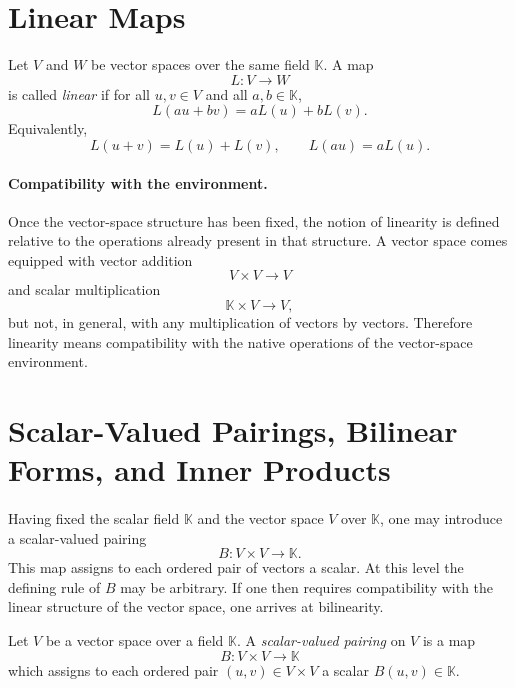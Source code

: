 \documentclass{article}
\begin{document}
\section{Linear Maps}

\begin{definition}
Let $V$ and $W$ be vector spaces over the same field $\mathbb{K}$. A map
$$
L:V\to W
$$
is called \emph{linear} if for all $u,v\in V$ and all $a,b\in\mathbb{K}$,
$$
L(au+bv)=aL(u)+bL(v).
$$
Equivalently,
$$
L(u+v)=L(u)+L(v),
\qquad
L(au)=aL(u).
$$
\end{definition}

\paragraph{Compatibility with the environment.}
Once the vector-space structure has been fixed, the notion of linearity is defined relative to the operations already present in that structure. A vector space comes equipped with vector addition
$$
V\times V\to V
$$
and scalar multiplication
$$
\mathbb{K}\times V\to V,
$$
but not, in general, with any multiplication of vectors by vectors. Therefore linearity means compatibility with the native operations of the vector-space environment.

\section{Scalar-Valued Pairings, Bilinear Forms, and Inner Products}

\paragraph{}
Having fixed the scalar field $\mathbb{K}$ and the vector space $V$ over $\mathbb{K}$, one may introduce a scalar-valued pairing
$$
B:V\times V\to\mathbb{K}.
$$
This map assigns to each ordered pair of vectors a scalar. At this level the defining rule of $B$ may be arbitrary. If one then requires compatibility with the linear structure of the vector space, one arrives at bilinearity.

\begin{definition}
Let $V$ be a vector space over a field $\mathbb{K}$. A \emph{scalar-valued pairing} on $V$ is a map
$$
B:V\times V\to\mathbb{K}
$$
which assigns to each ordered pair $(u,v)\in V\times V$ a scalar $B(u,v)\in\mathbb{K}$.
\end{definition}
\end{document}
